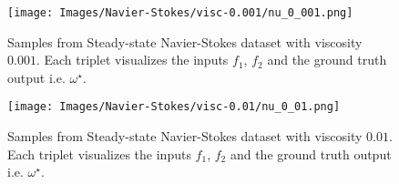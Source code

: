 \begin{figure}[!htbp]
    \centering
    \texttt{[image: Images/Navier-Stokes/visc-0.001/nu\_0\_001.png]}
    \label{fig:navier-stokes-data-visc-0.001}
    \caption{Samples from Steady-state Navier-Stokes dataset with viscosity $0.001$. 
    Each triplet visualizes the inputs $f_1$, $f_2$ and the ground truth output i.e. $\omega^\star$. }
\end{figure}

\begin{figure}[!htbp]
    \centering
    \texttt{[image: Images/Navier-Stokes/visc-0.01/nu\_0\_01.png]}
    \label{fig:navier-stokes-data-visc-0.01}
    \caption{Samples from Steady-state Navier-Stokes dataset with viscosity $0.01$. 
    Each triplet visualizes the inputs $f_1$, $f_2$ and the ground truth output i.e. $\omega^\star$. }
\end{figure}